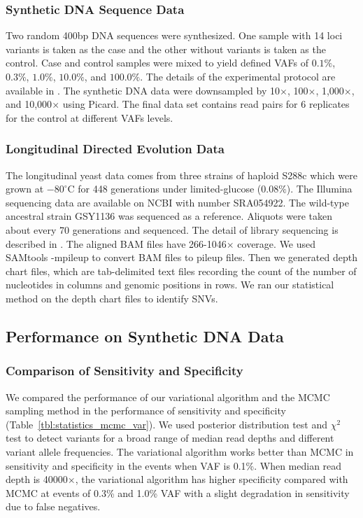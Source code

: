 \documentclass[11pt,reqno]{amsart}
\begin{document}
\subsubsection{Synthetic DNA Sequence Data}
Two random 400bp DNA sequences were synthesized. One sample with 14 loci variants is taken as the case and the other without variants is taken as the control.
Case and control samples were mixed to yield defined VAFs of $0.1\%$, $0.3\%$, $1.0\%$, $10.0\%$, and $100.0\%$.
The details of the experimental protocol are available in \citep{flaherty2011ultrasensitive}.
The synthetic DNA data were downsampled by 10$\times$, 100$\times$, 1,000$\times$, and 10,000$\times$ using Picard.
The final data set contains read pairs for 6 replicates for the control at different VAFs levels.

\subsubsection{Longitudinal Directed Evolution Data}
The longitudinal yeast data comes from three strains of haploid S288c which were grown at $-80^{\circ }\textrm{C}$ for 448 generations under limited-glucose (0.08$\%$).
The Illumina sequencing data are available on NCBI with number SRA054922.
The wild-type ancestral strain GSY1136 was sequenced as a reference.
Aliquots were taken about every 70 generations and sequenced.
The detail of library sequencing is described in \citep{kvitek2013whole, kao2008molecular}.
The aligned BAM files have 266-1046$\times$ coverage.
We used SAMtools -mpileup to convert BAM files to pileup files.
Then we generated depth chart files, which are tab-delimited text files recording the count of the number of nucleotides in columns and genomic positions in rows.
We ran our statistical method on the depth chart files to identify SNVs.

\subsection{Performance on Synthetic DNA Data}
\subsubsection{Comparison of Sensitivity and Specificity}
We compared the performance of our variational algorithm and the MCMC sampling method in the performance of sensitivity and specificity (Table~\ref{tbl:statistics_mcmc_var}).
We used posterior distribution test and $\chi^2$ test to detect variants for a broad range of median read depths and different variant allele frequencies.
The variational algorithm works better than MCMC in sensitivity and specificity in the events when VAF is 0.1\%.
When median read depth is 40000$\times$, the variational algorithm has higher specificity compared with MCMC at events of 0.3\% and 1.0\% VAF with a slight degradation in sensitivity due to false negatives.
\end{document}
